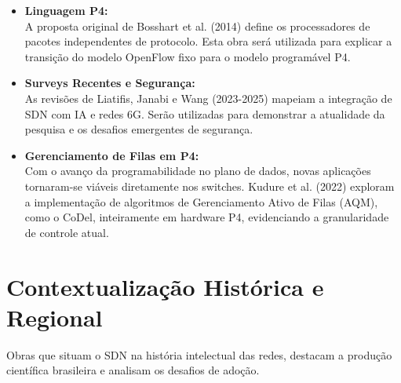 \documentclass[10pt]{IEEEtran}
\begin{document}
\begin{itemize}
    \item \cite{Bosshart:P4} \textbf{Linguagem P4:} \\
    A proposta original de Bosshart et al. (2014) define os processadores de pacotes independentes de protocolo. Esta obra será utilizada para explicar a transição do modelo OpenFlow fixo para o modelo programável P4.
    
    \item \cite{Liatifis:P4Survey, Janabi:Security2024, Wang:TrustworthyEI} \textbf{Surveys Recentes e Segurança:} \\
    As revisões de Liatifis, Janabi e Wang (2023-2025) mapeiam a integração de SDN com IA e redes 6G. Serão utilizadas para demonstrar a atualidade da pesquisa e os desafios emergentes de segurança.

    \item \cite{9972067} \textbf{Gerenciamento de Filas em P4:} \\
    Com o avanço da programabilidade no plano de dados, novas aplicações tornaram-se viáveis diretamente nos switches. Kudure et al. (2022) exploram a implementação de algoritmos de Gerenciamento Ativo de Filas (AQM), como o CoDel, inteiramente em hardware P4, evidenciando a granularidade de controle atual.
\end{itemize}

\section{Contextualização Histórica e Regional}
Obras que situam o SDN na história intelectual das redes, destacam a produção científica brasileira e analisam os desafios de adoção.
\end{document}
